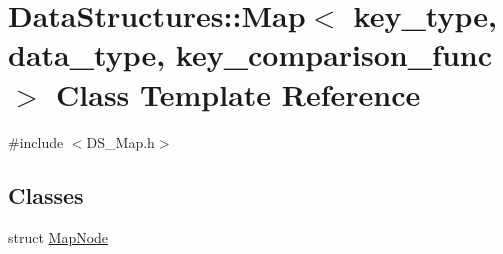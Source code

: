 \hypertarget{class_data_structures_1_1_map}{\section{Data\-Structures\-:\-:Map$<$ key\-\_\-type, data\-\_\-type, key\-\_\-comparison\-\_\-func $>$ Class Template Reference}
\label{class_data_structures_1_1_map}
}


{\ttfamily \#include $<$D\-S\-\_\-\-Map.\-h$>$}

\subsection*{Classes}
\begin{DoxyCompactItemize}
\item 
struct \hyperlink{struct_data_structures_1_1_map_1_1_map_node}{Map\-Node}
\end{DoxyCompactItemize}
